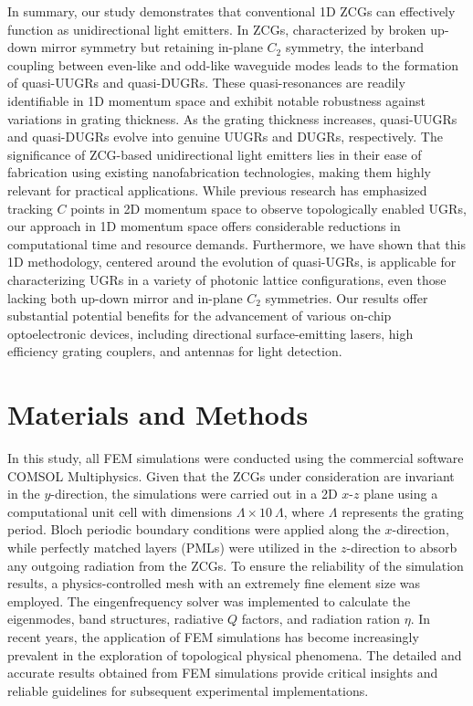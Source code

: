 \documentclass[%
 reprint,
superscriptaddress,
 amsmath,amssymb, aps,
]{revtex4-1}
\begin{document}
In summary, our study demonstrates that conventional 1D ZCGs can effectively function as unidirectional light emitters. In ZCGs, characterized by broken up-down mirror symmetry but retaining in-plane $C_2$ symmetry, the interband coupling between even-like and odd-like waveguide modes leads to the formation of quasi-UUGRs and quasi-DUGRs. These quasi-resonances are readily identifiable in 1D momentum space and exhibit notable robustness against variations in grating thickness. As the grating thickness increases, quasi-UUGRs and quasi-DUGRs evolve into genuine UUGRs and DUGRs, respectively. The significance of ZCG-based unidirectional light emitters lies in their ease of fabrication using existing nanofabrication technologies, making them highly relevant for practical applications. While previous research has emphasized tracking $C$ points in 2D momentum space to observe topologically enabled UGRs, our approach in 1D momentum space offers considerable reductions in computational time and resource demands. Furthermore, we have shown that this 1D methodology, centered around the evolution of quasi-UGRs, is applicable for characterizing UGRs in a variety of photonic lattice configurations, even those lacking both up-down mirror and in-plane $C_2$ symmetries. Our results offer substantial potential benefits for the advancement of various on-chip optoelectronic devices, including directional surface-emitting lasers, high efficiency grating couplers, and antennas for light detection.

\section{Materials and Methods}
In this study, all FEM simulations were conducted using the commercial software COMSOL Multiphysics. Given that the ZCGs under consideration are invariant in the $y$-direction, the simulations were carried out in a 2D $x$-$z$ plane using a computational unit cell with dimensions $\Lambda \times 10~\Lambda$, where $\Lambda$ represents the grating period. Bloch periodic boundary conditions were applied along the $x$-direction, while perfectly matched layers (PMLs) were utilized in the $z$-direction to absorb any outgoing radiation from the ZCGs. To ensure the reliability of the simulation results, a physics-controlled mesh with an extremely fine element size was employed. The eingenfrequency solver was implemented to calculate the eigenmodes, band structures, radiative $Q$ factors, and radiation ration $\eta$. In recent years, the application of FEM simulations has become increasingly prevalent in the exploration of topological physical phenomena. The detailed and accurate results obtained from FEM simulations provide critical insights and reliable guidelines for subsequent experimental implementations.  
\end{document}
